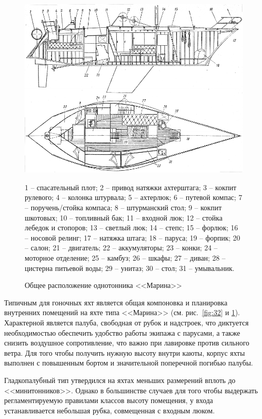 \documentclass[a4paper, 12pt, twoside, final, book, russian, fittopage, cyremdash]{ncc}
\newcommand{\ris}[1]{\ref{fig:#1}}
\begin{document}
\begin{figure}[htb]
  \centering
  \includegraphics[scale=1.3]{0033P}
  \caption{Общее расположение однотонника <<Марина>>}
  \label{fig:33}
  \small
  \centering{}
  1 \--- спасательный плот; 2 \--- привод натяжки ахтерштага; 3 \--- кокпит рулевого; 4 \--- колонка штурвала; 5 \--- ахтерлюк; 6 \--- путевой компас; 7 \--- поручень\-/стойка компаса; 8 \--- штурманский стол; 9 \--- кокпит шкотовых; 10 \--- топливный бак; 11 \--- входной люк; 12 \--- стойка лебедок и стопоров; 13 \--- светлый люк; 14 \--- степс; 15 \--- форлюк; 16 \--- носовой релинг; 17 \--- натяжка штага; 18 \--- паруса; 19 \--- форпик; 20 \--- салон; 21 \--- двигатель; 22 \--- аккумуляторы; 23 \--- конки; 24 \--- моторное отделение; 25 \--- камбуз; 26 \--- шкафы; 27 \--- диван; 28 \--- цистерна питьевой воды; 29 \--- унитаз; 30 \--- стол; 31 \--- умывальник. 
\end{figure}

Типичным для гоночных яхт является общая компоновка и планировка внутренних помещений на яхте типа <<Марина>> (см. рис.~\ris{32} и \ris{33}). Характерной является палуба, свободная от рубок и надстроек, что диктуется необходимостью обеспечить удобство работы экипажа с парусами, а также снизить воздушное сопротивление, что важно при лавировке против сильного ветра. Для того чтобы получить нужную высоту внутри каюты, корпус яхты выполнен с повышенным бортом и значительной поперечной погибью палубы.

Гладкопалубный тип утвердился на яхтах меньших размерений вплоть до <<минитонников>>. Однако в большинстве случаев для того чтобы выдержать регламентируемую правилами классов высоту помещения, у входа устанавливается небольшая рубка, совмещенная с входным люком. 
\end{document}
